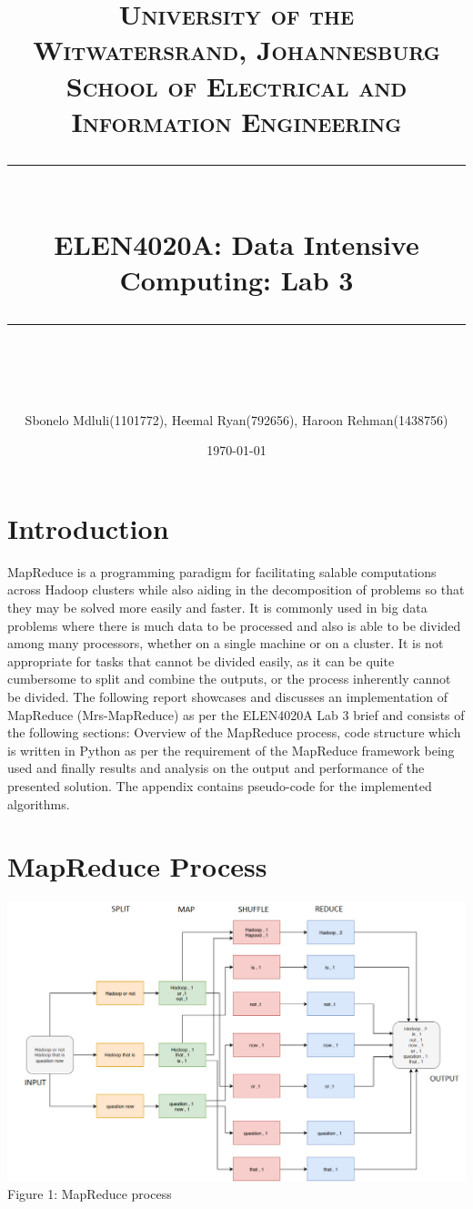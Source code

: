\documentclass[11pt,journal]{article}
\title{	
	\normalfont\largesize
	\textbf{\textsc{University of the Witwatersrand, Johannesburg}}\\
	\textsc{School of Electrical and Information Engineering}\\ 
	\vspace{5pt} %
	\rule{\linewidth}{0.5pt}\\ %
	\vspace{5pt} %
	{\huge ELEN4020A: Data Intensive Computing: Lab 3}\\ %
	\vspace{1pt} %
	\rule{\linewidth}{2pt}\\ %
	\vspace{1pt} %
}
\author{ Sbonelo Mdluli(1101772), Heemal Ryan(792656), Haroon Rehman(1438756) }
\date{\large\today}
\begin{document}
\maketitle 
\vspace{-35pt}
\section{Introduction}
MapReduce is a programming paradigm for facilitating salable computations across Hadoop clusters while also aiding in the decomposition of problems so that they may be solved more easily and faster. It is commonly used in big data problems where there is much data to be processed and also is able to be divided among many processors, whether on a single machine or on a cluster. It is not appropriate for tasks that cannot be divided easily, as it can be quite cumbersome to split and combine the outputs, or the process inherently cannot be divided.  The following report showcases and discusses an implementation of MapReduce (Mrs-MapReduce) as per the ELEN4020A Lab 3 brief and consists of the following sections: Overview of the MapReduce process, code structure which is written in Python as per the requirement of the MapReduce framework being used and finally results and analysis on the output and performance of the presented solution. The appendix contains pseudo-code for the implemented algorithms.

\section{MapReduce Process}

    \includegraphics[width=0.8\linewidth]{Capture.PNG}\\
    \caption{Figure 1: MapReduce process} \\
\end{document}
